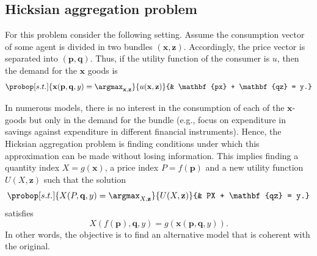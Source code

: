 \documentclass[english, a4paper, 12pt]{article}
\begin{document}

\subsection{Hicksian aggregation problem} \label{ssec:HicksAgg}
For this problem consider the following setting. Assume the consumption vector of some agent is divided in two bundles $(\mathbf{x}, \mathbf{z})$. Accordingly, the price vector is separated into $(\mathbf{p}, \mathbf{q})$. Thus, if the utility function of the consumer is $u$, then the demand for the $\mathbf{x}$ goods is
	\begin{equation} \label{eq:hickdisprob}
		\probop[s.t.]{\mathbf{x}(\mathbf{p}, \mathbf{q}, y) = \argmax_{\mathbf{x}, \mathbf{z}}}{u(\mathbf{x}, \mathbf{z})}
					{&	\mathbf{px} + \mathbf{qz} = y.}
	\end{equation}

In numerous models, there is no interest in the consumption of each of the $\mathbf{x}$-goods but only in the demand for the bundle (e.g., focus on expenditure in savings against expenditure in different financial instruments). Hence, the Hicksian aggregation problem is finding conditions under which this approximation can be made without losing information. This implies finding a quantity index $X = g(\mathbf{x})$, a price index $P = f(\mathbf{p})$ and a new utility function $U(X, \mathbf{z})$ such that the solution
	 \begin{equation} \label{eq:hickaggprob}
		\probop[s.t.]{X(P, \mathbf{q}, y) = \argmax_{X, \mathbf{z}}}{U(X, \mathbf{z})}
					{&	PX + \mathbf{qz} = y.}
	\end{equation}
satisfies
	$$X(f(\mathbf{p}), \mathbf{q}, y) = g(\mathbf{x}(\mathbf{p}, \mathbf{q}, y)).$$
In other words, the objective is to find an alternative model that is coherent with the original. 
\end{document}
